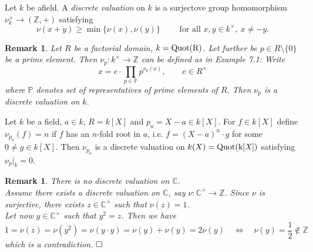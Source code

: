 \documentclass[11pt]{book}
\newtheorem{remark}[theorem]{Remark}
\theoremstyle{nonumberbreak}
\newenvironment{defin}[1][]{\ifthenelse{\equal{#1}{}}{\definition}{\definition[#1]}\rm}{\enddefinition}
\newenvironment{pr}[1][]{\ifthenelse{\equal{#1}{}}{\proof}{\proof[#1]}\rm}{\endproof}
\newenvironment{ex}[1][]{\ifthenelse{\equal{#1}{}}{\example}{\example[#1]}\rm}{\endexample}
\begin{document}
\begin{spacing}{1.3}
\begin{defin} %
Let $k$ be afield. A \textit{discrete valuation} on $k$ is a surjectove group homomorphism
$\nu_ k^{\times} \longrightarrow (\mathbb{Z},+)$
satisfying
$$\nu(x+y) \geqslant \min\{\nu(x), \nu(y)\} \qquad \textrm{ for all } x,y \in k^{\times}, \ x \neq -y.$$
\end{defin}

\begin{remark} %
Let $R$ be a factorial domain, $k=\rm{Quot}(R)$. Let further be $p \in R \setminus \{0\}$ be a prime element. Then 
$\nu_p: k^{\times} \longrightarrow \mathbb{Z}$ can be defined as in Example 7.1: Write
$$x=e \cdot \prod_{p \in \mathbb{P}} p^{\nu_p(x)}, \qquad e\in R^{\times}$$
where $\mathbb{P}$ denotes set of representatives of prime elements of $R$. Then $\nu_p$ is a discrete valuation on $k$.
\end{remark}

\begin{ex} %
Let $k$ be a field, $a \in k$, $R=k[X]$ and $p_a=X-a \in k[X]$.
For $f \in k[X]$ define $\nu_{p_a}(f)=n$ if $f$ has an $n$-fold root in $a$, i.e. $f=(X-a)^n \cdot g$ for some $0 \neq g \in k[X]$.
Then $\nu_{p_a}$ is a discrete valuation on $k(X)=\rm{Quot}(k[\mathit{X}])$ satisfying $\nu_p |_{k}=0$.
\end{ex}

\begin{remark} %
There is no discrete valuation on $\mathbb{C}$.\\
\begin{pr}
Assume there exists a discrete valuation on $\mathbb{C}$, say $\nu:\mathbb{C}^{\times} \longrightarrow \mathbb{Z}$. Since $\nu$ is surjective, there exists $z \in \mathbb{C}^{\times}$ such that $\nu(z)=1$.\\
Let now $y \in \mathbb{C}^{\times}$ such that $y^2=z$. Then we have
$$1= \nu(z)=\nu(y^2)= \nu(y \cdot y)= \nu(y)+\nu(y)=2 \nu(y) \quad \Longleftrightarrow \quad \nu(y)=\frac{1}{2} \notin \mathbb{Z}$$
which is a contradiction. $\hfill \Box$
\end{pr}
\end{remark}


\end{spacing}
\end{document}
